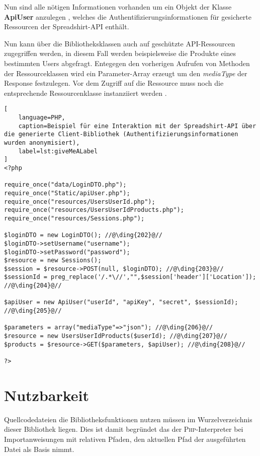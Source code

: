 Nun sind alle nötigen Informationen vorhanden um ein Objekt der Klasse \textbf{ApiUser} anzulegen , welches die Authentifizierungsinformationen für gesicherte Ressourcen der Spreadshirt-\gls{API} enthält.

Nun kann über die Bibliotheksklassen auch auf geschützte \gls{API}-Ressourcen zugegriffen werden, in diesem Fall werden beispielsweise die Produkte eines bestimmten Users abgefragt. Entegegen den vorherigen Aufrufen von Methoden der Ressourceklassen wird ein Parameter-Array erzeugt  um den \emph{mediaType} der Response festzulegen.
Vor dem Zugriff auf die Ressource muss noch die entsprechende Ressourcenklasse instanziiert werden .

\begin{minipage}{\textwidth}
\begin{lstlisting}[
    language=PHP,
    caption=Beispiel für eine Interaktion mit der Spreadshirt-API über die generierte Client-Bibliothek (Authentifizierungsinformationen wurden anonymisiert),
    label=lst:giveMeALabel
]
<?php

require_once("data/LoginDTO.php");
require_once("Static/apiUser.php");
require_once("resources/UsersUserId.php");
require_once("resources/UsersUserIdProducts.php");
require_once("resources/Sessions.php");

$loginDTO = new LoginDTO(); //@\ding{202}@//
$loginDTO->setUsername("username");
$loginDTO->setPassword("password");
$resource = new Sessions();
$session = $resource->POST(null, $loginDTO); //@\ding{203}@//
$sessionId = preg_replace('/.*\//',"",$session['header']['Location']); //@\ding{204}@//

$apiUser = new ApiUser("userId", "apiKey", "secret", $sessionId); //@\ding{205}@//

$parameters = array("mediaType"=>"json"); //@\ding{206}@//
$resource = new UsersUserIdProducts($userId); //@\ding{207}@//
$products = $resource->GET($parameters, $apiUser); //@\ding{208}@//

?>
\end{lstlisting}
\end{minipage}


\section{Nutzbarkeit}
\label{sec:usability}

Quellcodedateien die Bibliotheksfunktionen nutzen müssen im Wurzelverzeichnis dieser Bibliothek liegen. Dies ist damit begründet das der \textsc{Php}-Interpreter bei Importanweisungen mit relativen Pfaden, den aktuellen Pfad der ausgeführten Datei als Basis nimmt.

